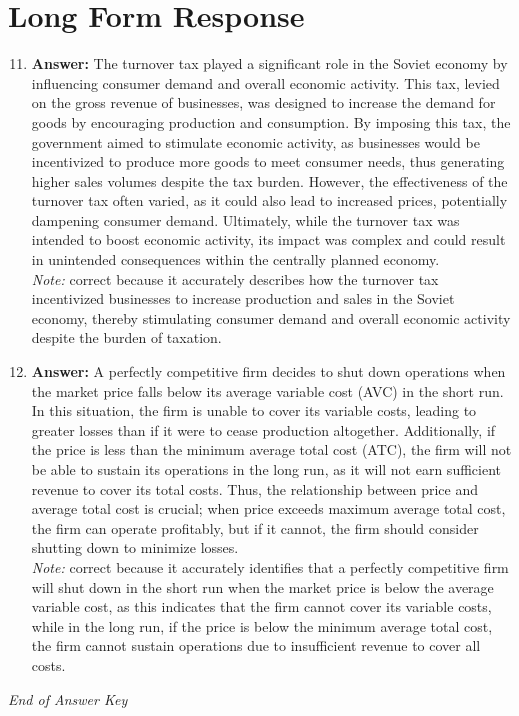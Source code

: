 \documentclass[12pt]{article}
\begin{document}
\section*{Long Form Response}
\begin{enumerate}[label=\arabic*.]
\setcounter{enumi}{10}
\item \textbf{Answer:} The turnover tax played a significant role in the Soviet economy by influencing consumer demand and overall economic activity. This tax, levied on the gross revenue of businesses, was designed to increase the demand for goods by encouraging production and consumption. By imposing this tax, the government aimed to stimulate economic activity, as businesses would be incentivized to produce more goods to meet consumer needs, thus generating higher sales volumes despite the tax burden. However, the effectiveness of the turnover tax often varied, as it could also lead to increased prices, potentially dampening consumer demand. Ultimately, while the turnover tax was intended to boost economic activity, its impact was complex and could result in unintended consequences within the centrally planned economy.
\\ \textit{Note:} correct because it accurately describes how the turnover tax incentivized businesses to increase production and sales in the Soviet economy, thereby stimulating consumer demand and overall economic activity despite the burden of taxation.
\item \textbf{Answer:} A perfectly competitive firm decides to shut down operations when the market price falls below its average variable cost (AVC) in the short run. In this situation, the firm is unable to cover its variable costs, leading to greater losses than if it were to cease production altogether. Additionally, if the price is less than the minimum average total cost (ATC), the firm will not be able to sustain its operations in the long run, as it will not earn sufficient revenue to cover its total costs. Thus, the relationship between price and average total cost is crucial; when price exceeds maximum average total cost, the firm can operate profitably, but if it cannot, the firm should consider shutting down to minimize losses.
\\ \textit{Note:} correct because it accurately identifies that a perfectly competitive firm will shut down in the short run when the market price is below the average variable cost, as this indicates that the firm cannot cover its variable costs, while in the long run, if the price is below the minimum average total cost, the firm cannot sustain operations due to insufficient revenue to cover all costs.
\end{enumerate}

\vfill
\noindent\textit{End of Answer Key}
\end{document}
